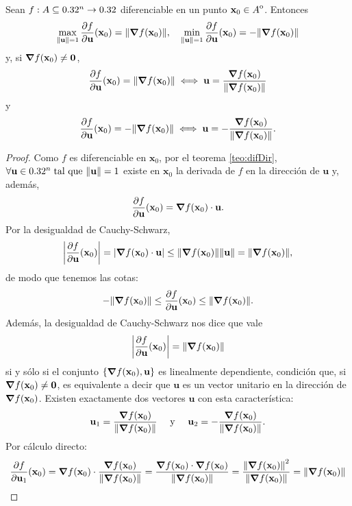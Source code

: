 \begin{theorem}
 Sean $f: A  \subseteq  0.32^n \to 0.32$ diferenciable en un punto $\mathbf{x}_0 \in {\kern0ptA}^{\mathrm{o}}$. Entonces 
 \[
  \max_{\norm{{\mathbf{u}}} = 1} \frac{\partial f}{\partial {\mathbf{u}}} (\mathbf{x}_0) = \norm{\grad f (\mathbf{x}_0)}, \quad 
  \min_{\norm{{\mathbf{u}}} = 1} \frac{\partial f}{\partial {\mathbf{u}}} (\mathbf{x}_0) = -\norm{\grad f (\mathbf{x}_0)}
 \]
y, si $\grad f(\mathbf{x}_0) \ne \mathbf{0}$,
\[
 \frac{\partial f}{\partial {\mathbf{u}}} (\mathbf{x}_0) = \norm{\grad f (\mathbf{x}_0)} \iff {\mathbf{u}} = \frac{\grad f(\mathbf{x}_0)}{\norm{\grad f(\mathbf{x}_0)}}
\]
y
\[
 \frac{\partial f}{\partial {\mathbf{u}}} (\mathbf{x}_0) = -\norm{\grad f (\mathbf{x}_0)} \iff {\mathbf{u}} = -\frac{\grad f(\mathbf{x}_0)}{\norm{\grad f(\mathbf{x}_0)}}.
\]
\begin{proof}  Como $f$ es diferenciable en $\mathbf{x}_0$, por el teorema \eqref{teo:difDir}, $\forall {\mathbf{u}} \in 0.32^n\;\text{tal que } \norm{{\mathbf{u}}} = 1$ existe en $\mathbf{x}_0$ la derivada de $f$ en la direcci\'on de ${\mathbf{u}}$ y, adem\'as,
\[
 \frac{\partial f}{\partial {\mathbf{u}}} (\mathbf{x}_0) = \grad f (\mathbf{x}_0) \cdot {\mathbf{u}}.
\]
Por la desigualdad de Cauchy-Schwarz, 
\[
 \abs{\frac{\partial f}{\partial {\mathbf{u}}} (\mathbf{x}_0)} = \abs{\grad f (\mathbf{x}_0) \cdot {\mathbf{u}}} \le \norm{\grad f (\mathbf{x}_0)}\norm{{\mathbf{u}}} = \norm{\grad f (\mathbf{x}_0)},
\]
de modo que tenemos las cotas:
\[
 -\norm{\grad f (\mathbf{x}_0)} \le \frac{\partial f}{\partial {\mathbf{u}}}(\mathbf{x}_0) \le \norm{\grad f (\mathbf{x}_0)}.
\]
Adem\'as, la desigualdad de Cauchy-Schwarz nos dice que vale
\[
 \abs{\frac{\partial f}{\partial {\mathbf{u}}} (\mathbf{x}_0)} = \norm{\grad f (\mathbf{x}_0)}
\]
si y s\'olo si el conjunto $\{\grad f(\mathbf{x}_0), {\mathbf{u}} \}$ es linealmente dependiente, condici\'on que, si $\grad f(\mathbf{x}_0) \ne \mathbf{0}$, es equivalente a decir que ${\mathbf{u}}$ es un vector unitario en la direcci\'on de $\grad f(\mathbf{x}_0)$. Existen exactamente dos vectores ${\mathbf{u}}$ con esta caracter\'istica:
\[
 {\mathbf{u}}_1 = \frac{\grad f(\mathbf{x}_0)}{\norm{\grad f(\mathbf{x}_0)}} \quad \text{ y } \quad {\mathbf{u}}_2 = -\frac{\grad f(\mathbf{x}_0)}{\norm{\grad f(\mathbf{x}_0)}}.
\]
Por c\'alculo directo:
\begin{align*}
 \frac{\partial f}{\partial {\mathbf{u}}_1} (\mathbf{x}_0) &= \grad f (\mathbf{x}_0) \cdot \frac{\grad f(\mathbf{x}_0)}{\norm{\grad f(\mathbf{x}_0)}} = \frac{ \grad f (\mathbf{x}_0) \cdot \grad f(\mathbf{x}_0) }{\norm{\grad f(\mathbf{x}_0)}} = \frac{\norm{\grad f (\mathbf{x}_0)}^2 }{\norm{\grad f(\mathbf{x}_0)}} = \norm{\grad f (\mathbf{x}_0)} \\

\end{align*}
\end{proof}
\end{theorem}
